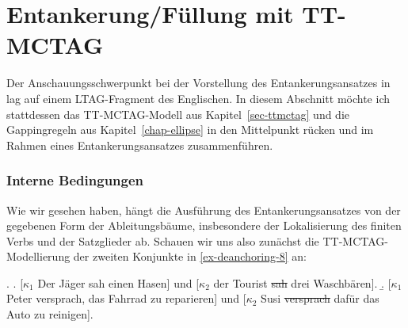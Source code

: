 \section{Entankerung/Füllung mit TT-MCTAG}  \label{sec-deanchoring-ttmctag}

Der Anschauungsschwerpunkt bei der Vorstellung des Entankerungsansatzes in \cite{Lichte:Kallmeyer:10} lag auf einem LTAG-Fragment des Englischen. In diesem Abschnitt möchte ich stattdessen das TT-MCTAG-Modell aus Kapitel~\ref{sec-ttmctag} und die Gappingregeln aus Kapitel~\ref{chap-ellipse} in den Mittelpunkt rücken und im Rahmen eines Entankerungsansatzes zusammenführen. 


\subsubsection*{Interne Bedingungen}

Wie wir gesehen haben, hängt die Ausführung des Entankerungsansatzes von der gegebenen Form der Ableitungsbäume, insbesondere der Lokalisierung des finiten Verbs und der Satzglieder ab. Schauen wir uns also zunächst die TT-MCTAG-Modellierung der zweiten Konjunkte in \ref{ex-deanchoring-8} an:

\ex. \label{ex-deanchoring-8}
\a. \label{ex-deanchoring-8-a} [$\kappa_1$ Der Jäger sah einen Hasen] und [$\kappa_2$ der Tourist \sout{sah} drei Waschbären].
\b. \label{ex-deanchoring-8-b} [$\kappa_1$ Peter versprach, das Fahrrad zu reparieren] und [$\kappa_2$ Susi \sout{versprach} dafür das Auto zu reinigen].


